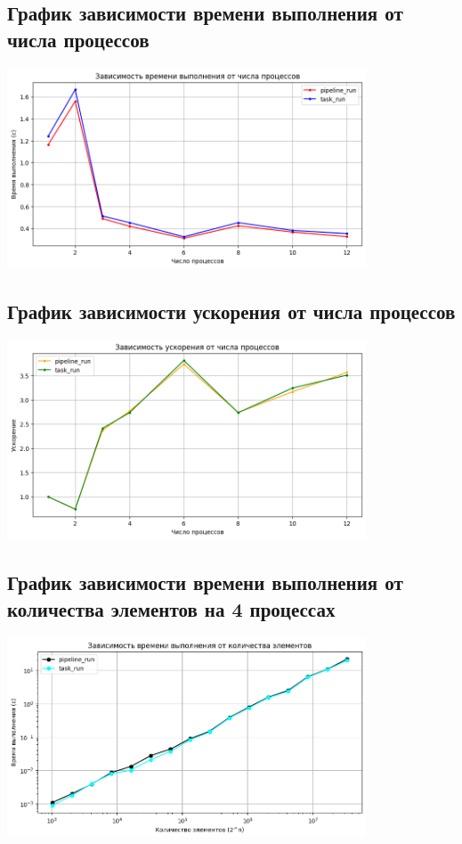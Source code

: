 \documentclass[a4paper,12pt]{article}
\begin{document}
\subsection{График зависимости времени выполнения от числа процессов}
\begin{center}
\includegraphics[width=0.8\textwidth]{time num.png}
\end{center}

\subsection{График зависимости ускорения от числа процессов}
\begin{center}
\includegraphics[width=0.8\textwidth]{speed num.png}
\end{center}

\subsection{График зависимости времени выполнения от количества элементов на 4 процессах}
\begin{center}
\includegraphics[width=0.8\textwidth]{time els four processes.png}
\end{center}
\end{document}
